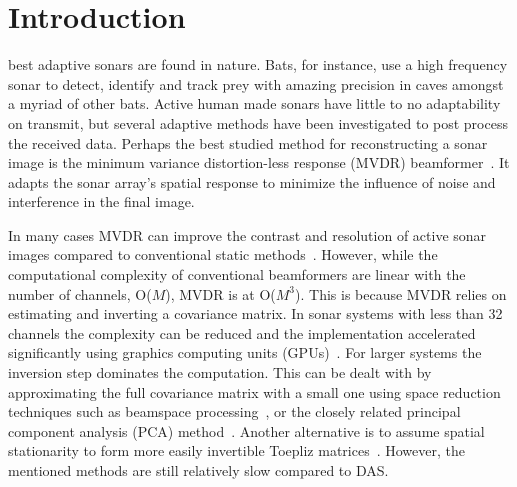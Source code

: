 \documentclass[10pt,journal,draftclsnofoot,onecolumn]{IEEEtran}
\newcommand\1{\vec 1}
\begin{document}
\IEEEdisplaynotcompsoctitleabstractindextext


\IEEEpeerreviewmaketitle

\section{Introduction}


 best adaptive sonars are found in nature. Bats, for instance, use a high frequency sonar to detect, identify and track prey with amazing precision in caves amongst a myriad of other bats. Active human made sonars have little to no adaptability on transmit, but several adaptive methods have been investigated to post process the received data. Perhaps the best studied method for reconstructing a sonar image is the minimum variance distortion-less response (MVDR) beamformer~\cite{Capon1969}. It adapts the sonar array's spatial response to minimize the influence of noise and interference in the final image.

In many cases MVDR can improve the contrast and resolution of active sonar images compared to conventional static methods~\cite{Blomberg2013,Blomberg2012a,Lo2004}. However, while the computational complexity of conventional beamformers are linear with the number of channels, O($M$), MVDR is at O($M^3$). This is because MVDR relies on estimating and inverting a covariance matrix. In sonar systems with less than 32 channels the complexity can be reduced and the implementation accelerated significantly using graphics computing units (GPUs)~\cite{Buskenes2014}. For larger systems the inversion step dominates the computation. This can be dealt with by approximating the full covariance matrix with a small one using space reduction techniques such as beamspace processing~\cite{Asen2013}, or the closely related principal component analysis (PCA) method~\cite{Kim2014}. Another alternative is to assume spatial stationarity to form more easily invertible Toepliz matrices~\cite{Asl2012}. However, the  mentioned methods are still relatively slow compared to DAS.
\end{document}
